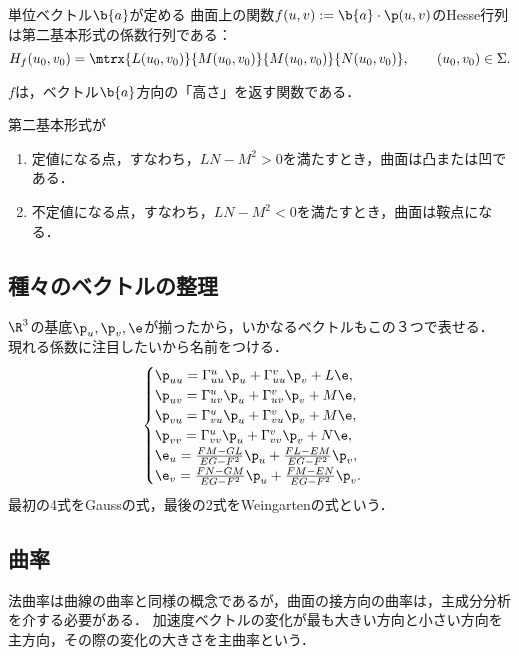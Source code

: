 \documentclass[uplatex,dvipdfmx]{jsreport}
\begin{document}
\begin{lemma}
    単位ベクトル$\b{a}$が定める
    曲面上の関数$f(u,v):=\b{a}\cdot\p(u,v)$のHesse行列は第二基本形式の係数行列である：
    \[H_f(u_0,v_0)=\mtrx{L(u_0,v_0)}{M(u_0,v_0)}{M(u_0,v_0)}{N(u_0,v_0)},\qquad(u_0,v_0)\in\Sigma.\]
\end{lemma}
\begin{remarks}
    $f$は，ベクトル$\b{a}$方向の「高さ」を返す関数である．
\end{remarks}

\begin{corollary}
    第二基本形式が
    \begin{enumerate}
        \item 定値になる点，すなわち，$LN-M^2>0$を満たすとき，曲面は凸または凹である．
        \item 不定値になる点，すなわち，$LN-M^2<0$を満たすとき，曲面は鞍点になる．
    \end{enumerate}
\end{corollary}

\subsection{種々のベクトルの整理}

\begin{observation}
    $\R^3$の基底$\p_u,\p_v,\e$が揃ったから，いかなるベクトルもこの３つで表せる．
    現れる係数に注目したいから名前をつける．
    \[\begin{cases}
        \p_{uu}=\Gamma^u_{uu}\p_u+\Gamma^v_{uu}\p_v+L\e,\\
        \p_{uv}=\Gamma^u_{uv}\p_u+\Gamma^v_{uv}\p_v+M\e,\\
        \p_{vu}=\Gamma^u_{vu}\p_u+\Gamma^v_{vu}\p_v+M\e,\\
        \p_{vv}=\Gamma^u_{vv}\p_u+\Gamma^v_{vv}\p_v+N\e,\\
        \e_u=\frac{FM-GL}{EG-F^2}\p_u+\frac{FL-EM}{EG-F^2}\p_v,\\
        \e_v=\frac{FN-GM}{EG-F^2}\p_u+\frac{FM-EN}{EG-F^2}\p_v.
    \end{cases}\]
    最初の4式をGaussの式，最後の2式をWeingartenの式という．
\end{observation}

\subsection{曲率}

\begin{tcolorbox}[colframe=ForestGreen, colback=ForestGreen!10!white,breakable,colbacktitle=ForestGreen!40!white,coltitle=black,fonttitle=\bfseries\sffamily,
title=]
    法曲率は曲線の曲率と同様の概念であるが，曲面の接方向の曲率は，主成分分析を介する必要がある．
    加速度ベクトルの変化が最も大きい方向と小さい方向を主方向，その際の変化の大きさを主曲率という．

\end{tcolorbox}
\end{document}
